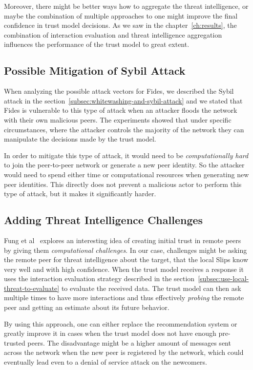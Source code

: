 Moreover, there might be better ways how to aggregate the threat intelligence, or maybe the combination of multiple approaches to one might improve the final confidence in trust model decisions.
As we saw in the chapter~\ref{ch:results}, the combination of interaction evaluation and threat intelligence aggregation influences the performance of the trust model to great extent.

\subsection{Possible Mitigation of Sybil Attack}
\label{subsec:possible-mittigation-of-sybil-attack}
When analyzing the possible attack vectors for Fides, we described the Sybil attack in the section~\ref{subsec:whitewashing-and-sybil-attack} and we stated that Fides is vulnerable to this type of attack when an attacker floods the network with their own malicious peers.
The experiments showed that under specific circumstances, where the attacker controls the majority of the network they can manipulate the decisions made by the trust model.

In order to mitigate this type of attack, it would need to be \textit{computationally hard} to join the peer-to-peer network or generate a new peer identity.
So the attacker would need to spend either time or computational resources when generating new peer identities.
This directly does not prevent a malicious actor to perform this type of attack, but it makes it significantly harder.

\subsection{Adding Threat Intelligence Challenges}
\label{subsec:adding-threat-intelligence-challenges}
Fung et al~\cite{fung2008trust} explores an interesting idea of creating initial trust in remote peers by giving them \textit{computational challenges}.
In our case, challenges might be asking the remote peer for threat intelligence about the target, that the local Slips know very well and with high confidence.
When the trust model receives a response it uses the interaction evaluation strategy described in the section~\ref{subsec:use-local-threat-to-evaluate} to evaluate the received data.
The trust model can then ask multiple times to have more interactions and thus effectively \textit{probing} the remote peer and getting an estimate about its future behavior.

By using this approach, one can either replace the recommendation system or greatly improve it in cases when the trust model does not have enough pre-trusted peers.
The disadvantage might be a higher amount of messages sent across the network when the new peer is registered by the network, which could eventually lead even to a denial of service attack on the newcomers. 

